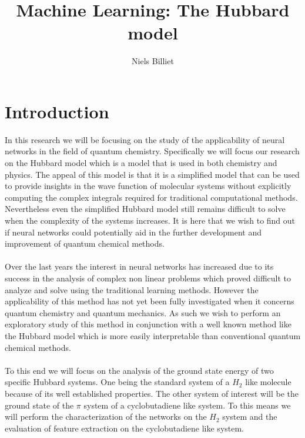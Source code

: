 \documentclass[12pt]{article}
\begin{document}
\title{Machine Learning: The Hubbard model}
\author{Niels Billiet}
\maketitle
\newpage
\tableofcontents
\newpage
\section{Introduction}

In this research we will be focusing on the study of the applicability of neural networks in the field of quantum chemistry. Specifically we will focus our research on the Hubbard model which is a model that is used in both chemistry and physics. The appeal of this model is that it is a simplified model that can be used to provide insights in the wave function of molecular systems without explicitly computing the complex integrals required for traditional computational methods. Nevertheless even the simplified Hubbard model still remains difficult to solve when the complexity of the systems increases. It is here that we wish to find out if neural networks could potentially aid in the further development and improvement of quantum chemical methods.
\\
\\
Over the last years the interest in neural networks has increased due to its success in the analysis of complex non linear problems which proved difficult to analyze and solve using the traditional learning methods\cite{Penedo, Hinton2012, Tian, Lawrence1996, Carleo2016, GIacomini2001}. However the applicability of this method has not yet been fully investigated when it concerns quantum chemistry and quantum mechanics. As such we wish to perform an exploratory study of this method in conjunction with a well known method like the Hubbard model which is more easily interpretable than conventional quantum chemical methods.
\\
\\
To this end we will focus on the analysis of the ground state energy of two specific Hubbard systems. One being the standard system of a $H_2$ like molecule because of its well established properties. The other system of interest will be the ground state of the $\pi$ system of a cyclobutadiene like system. To this means we will perform the characterization of the networks on the $H_2$ system and the evaluation of feature extraction on the cyclobutadiene like system. 
\\
\\
\end{document}
